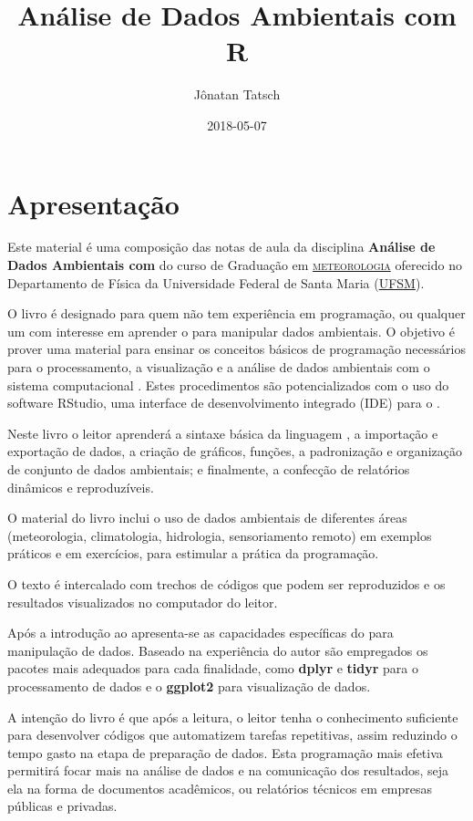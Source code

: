 \documentclass[]{book}
\title{Análise de Dados Ambientais com R}
\author{Jônatan Tatsch}
\date{2018-05-07}
\begin{document}
\maketitle

{
\setcounter{tocdepth}{1}
\tableofcontents
}
\chapter*{Apresentação}\label{apresentacao}

Este material é uma composição das notas de aula da disciplina
\textbf{Análise de Dados Ambientais com } do curso de Graduação em
\href{http://w3.ufsm.br/meteorologia/}{\textsc{meteorologia}} oferecido
no Departamento de Física da Universidade Federal de Santa Maria
(\href{http://site.ufsm.br/}{UFSM}).

O livro é designado para quem não tem experiência em programação, ou
qualquer um com interesse em aprender o para manipular dados ambientais.
O objetivo é prover uma material para ensinar os conceitos básicos de
programação necessários para o processamento, a visualização e a análise
de dados ambientais com o sistema computacional . Estes procedimentos
são potencializados com o uso do software RStudio, uma interface de
desenvolvimento integrado (IDE) para o .

Neste livro o leitor aprenderá a sintaxe básica da linguagem
\citep{R-base}, a importação e exportação de dados, a criação de
gráficos, funções, a padronização e organização de conjunto de dados
ambientais; e finalmente, a confecção de relatórios dinâmicos e
reproduzíveis.

O material do livro inclui o uso de dados ambientais de diferentes áreas
(meteorologia, climatologia, hidrologia, sensoriamento remoto) em
exemplos práticos e em exercícios, para estimular a prática da
programação.

O texto é intercalado com trechos de códigos que podem ser reproduzidos
e os resultados visualizados no computador do leitor.

Após a introdução ao apresenta-se as capacidades específicas do para
manipulação de dados. Baseado na experiência do autor são empregados os
pacotes mais adequados para cada finalidade, como \textbf{dplyr} e
\textbf{tidyr} para o processamento de dados e o \textbf{ggplot2} para
visualização de dados.

A intenção do livro é que após a leitura, o leitor tenha o conhecimento
suficiente para desenvolver códigos que automatizem tarefas repetitivas,
assim reduzindo o tempo gasto na etapa de preparação de dados. Esta
programação mais efetiva permitirá focar mais na análise de dados e na
comunicação dos resultados, seja ela na forma de documentos acadêmicos,
ou relatórios técnicos em empresas públicas e privadas.
\end{document}
